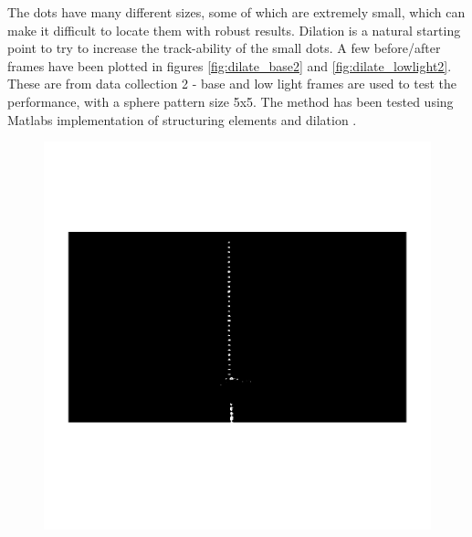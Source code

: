The dots have many different sizes, some of which are extremely small, which can make it difficult to locate them with robust results. Dilation is a natural starting point to try to increase the track-ability of the small dots. A few before/after frames have been plotted in figures \ref{fig:dilate_base2} and \ref{fig:dilate_lowlight2}. These are from data collection 2 - base and low light frames are used to test the performance, with a sphere pattern size 5x5. The method has been tested using Matlabs implementation of structuring elements \cite{matlab_strel} and dilation \cite{matlab_imdilate}. \vspace{-0.5cm}
\begin{figure}[H]
	\centering
	\begin{minipage}[t]{0.48\textwidth}
		\centering
		\includegraphics[width=1.0\textwidth]{figures/ImageAnalysis/dilation/base2_no_dilation.png}
	\end{minipage}
	\hspace{0.01\textwidth}
	\begin{minipage}[t]{0.48\textwidth}
		\centering

\end{minipage}
\end{figure}
